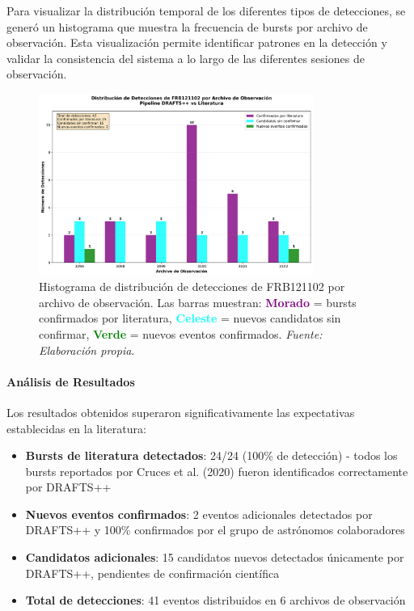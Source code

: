 Para visualizar la distribución temporal de los diferentes tipos de detecciones, se generó un histograma que muestra la frecuencia de bursts por archivo de observación. Esta visualización permite identificar patrones en la detección y validar la consistencia del sistema a lo largo de las diferentes sesiones de observación.

\begin{figure}[H]
    \centering
    \includegraphics[width=0.8\textwidth]{figures/frb121102_detection_histogram.png}
    \caption{Histograma de distribución de detecciones de FRB121102 por archivo de observación. Las barras muestran: \textcolor{purple}{\textbf{Morado}} = bursts confirmados por literatura, \textcolor{cyan}{\textbf{Celeste}} = nuevos candidatos sin confirmar, \textcolor{green}{\textbf{Verde}} = nuevos eventos confirmados. \textit{Fuente: Elaboración propia}.}
    \label{fig:frb121102_histogram}
\end{figure}

\paragraph{Análisis de Resultados}

Los resultados obtenidos superaron significativamente las expectativas establecidas en la literatura:

\begin{itemize}
    \item \textbf{Bursts de literatura detectados}: 24/24 (100\% de detección) - todos los bursts reportados por Cruces et al. (2020) fueron identificados correctamente por DRAFTS++
    \item \textbf{Nuevos eventos confirmados}: 2 eventos adicionales detectados por DRAFTS++ y 100\% confirmados por el grupo de astrónomos colaboradores
    \item \textbf{Candidatos adicionales}: 15 candidatos nuevos detectados únicamente por DRAFTS++, pendientes de confirmación científica
    \item \textbf{Total de detecciones}: 41 eventos distribuidos en 6 archivos de observación
\end{itemize}

